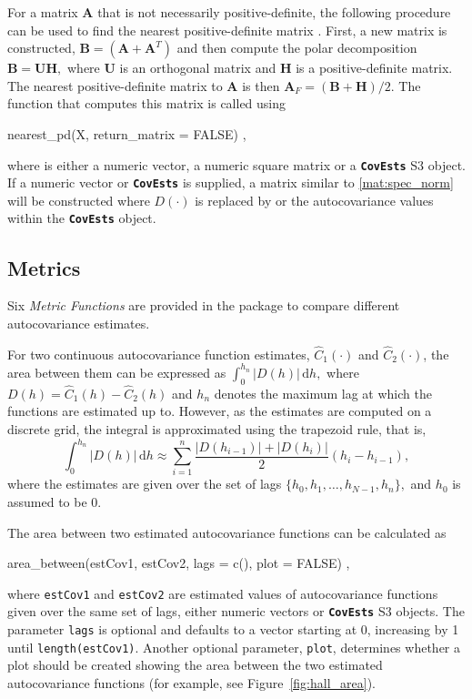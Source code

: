 For a matrix \(\bm{A}\) that is not necessarily positive-definite, the following procedure can be used to find the nearest positive-definite matrix \cite[Th.~2.1]{Higham1988}.
First, a new matrix is constructed, \(\bm{B} = \left(\bm{A} + \bm{A}^{T} \right)\) and then compute the polar decomposition \(\bm{B} = \bm{U} \bm{H}, \) where \(\bm{U}\) is an orthogonal matrix and \(\bm{H}\) is a positive-definite matrix. The nearest positive-definite matrix to \(\bm{A}\) is then \(\bm{A}_{F} = \left(\bm{B} + \bm{H}\right) / 2 .\)
The function that computes this matrix is called using
\begin{example}
nearest_pd(X, return_matrix = FALSE) ,
\end{example}
where  is either a numeric vector, a numeric square matrix or a \textbf{\texttt{CovEsts}} S3 object. If a numeric vector or \textbf{\texttt{CovEsts}} is supplied, a matrix similar to \eqref{mat:spec_norm} will be constructed where \(D(\cdot)\) is replaced by  or the autocovariance values within the \textbf{\texttt{CovEsts}} object.

\subsection{Metrics}
Six \textit{Metric Functions} are provided in the package to compare different autocovariance estimates.

For two continuous autocovariance function estimates, \(\widehat{C}_{1}(\cdot)\) and \(\widehat{C}_{2}(\cdot)\), the area between them can be expressed as 
\(
\int_{0}^{h_{n}} \left| D(h) \right| \, \text{d}h ,
\)
where \(D(h) = \widehat{C}_{1}(h) - \widehat{C}_{2}(h)\) and \(h_{n}\) denotes the maximum lag at which the functions are estimated up to.
However, as the estimates are computed on a discrete grid, the integral is approximated using the trapezoid rule, that is,
\[
\int_{0}^{h_{n}} \left| D(h) \right| \, \text{d}h 
\approx \sum_{i = 1}^{n} \frac{\left| D(h_{i - 1}) \right| + \left| D(h_{i}) \right|}{2} (h_{i} - h_{i-1}) ,
\]
where the estimates are given over the set of lags \(\{h_{0} , h_{1} , \dots , h_{N - 1}, h_{n} \},\) and \(h_{0}\) is assumed to be 0.

The area between two estimated autocovariance functions can be calculated as 
\begin{example}
    area_between(estCov1, estCov2, lags = c(), plot = FALSE) ,
\end{example}
where \texttt{estCov1} and \texttt{estCov2} are estimated values of autocovariance functions given over the same set of lags, either numeric vectors or \textbf{\texttt{CovEsts}} S3 objects. The parameter \texttt{lags} is optional and defaults to a vector starting at 0, increasing by 1 until \texttt{length(estCov1)}. Another optional parameter, \texttt{plot}, determines whether a plot should be created showing the area between the two estimated autocovariance functions (for example, see Figure~\ref{fig:hall_area}).

